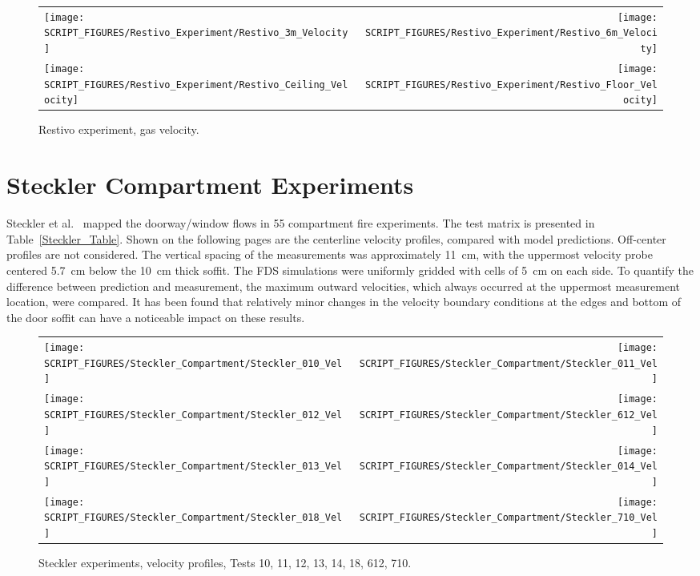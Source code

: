 \begin{figure}[h!]
\begin{tabular*}{\textwidth}{l@{\extracolsep{\fill}}r}
\texttt{[image: SCRIPT\_FIGURES/Restivo\_Experiment/Restivo\_3m\_Velocity]} &
\texttt{[image: SCRIPT\_FIGURES/Restivo\_Experiment/Restivo\_6m\_Velocity]} \\
\texttt{[image: SCRIPT\_FIGURES/Restivo\_Experiment/Restivo\_Ceiling\_Velocity]} &
\texttt{[image: SCRIPT\_FIGURES/Restivo\_Experiment/Restivo\_Floor\_Velocity]}
\end{tabular*}
\caption[Restivo experiment, gas velocity]{Restivo experiment, gas velocity.}
\label{Restivo_Velocity}
\end{figure}

\clearpage

\section{Steckler Compartment Experiments}

Steckler et al.~\cite{Steckler:NBSIR_82-2520} mapped the doorway/window flows in 55 compartment fire experiments. The test matrix is presented in Table~\ref{Steckler_Table}. Shown on the following pages are the centerline velocity profiles, compared with model predictions. Off-center profiles are not considered. The vertical spacing of the measurements was approximately 11~cm, with the uppermost velocity probe centered 5.7~cm below the 10~cm thick soffit. The FDS simulations were uniformly gridded with cells of 5~cm on each side. To quantify the difference between prediction and measurement, the maximum outward velocities, which always occurred at the uppermost measurement location, were compared. It has been found that relatively minor changes in the velocity boundary conditions at the edges and bottom of the door soffit can have a noticeable impact on these results.

\newpage

\begin{figure}[p]
\begin{tabular*}{\textwidth}{l@{\extracolsep{\fill}}r}
\texttt{[image: SCRIPT\_FIGURES/Steckler\_Compartment/Steckler\_010\_Vel]} &
\texttt{[image: SCRIPT\_FIGURES/Steckler\_Compartment/Steckler\_011\_Vel]} \\
\texttt{[image: SCRIPT\_FIGURES/Steckler\_Compartment/Steckler\_012\_Vel]} &
\texttt{[image: SCRIPT\_FIGURES/Steckler\_Compartment/Steckler\_612\_Vel]} \\
\texttt{[image: SCRIPT\_FIGURES/Steckler\_Compartment/Steckler\_013\_Vel]} &
\texttt{[image: SCRIPT\_FIGURES/Steckler\_Compartment/Steckler\_014\_Vel]} \\
\texttt{[image: SCRIPT\_FIGURES/Steckler\_Compartment/Steckler\_018\_Vel]} &
\texttt{[image: SCRIPT\_FIGURES/Steckler\_Compartment/Steckler\_710\_Vel]}
\end{tabular*}
\caption[Steckler experiments, velocity profiles, Tests 10, 11, 12, 13, 14, 18, 612, 710]{Steckler experiments, velocity profiles, Tests 10, 11, 12, 13, 14, 18, 612, 710.}
\label{Steckler_Vel_1}
\end{figure}

